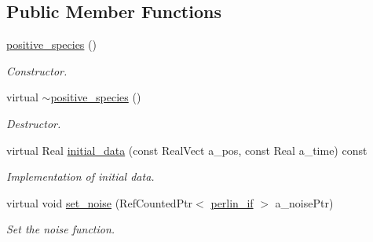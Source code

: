 \subsection*{Public Member Functions}
\begin{DoxyCompactItemize}
\item 
\hyperlink{classair__bolsig_1_1positive__species_a88ba2f6067b9c2c389585379de4f12ec}{positive\+\_\+species} ()
\begin{DoxyCompactList}\small\item\em Constructor. \end{DoxyCompactList}\item 
virtual \hyperlink{classair__bolsig_1_1positive__species_a4c6f9b6a4d05ace06a893184702e56a2}{$\sim$positive\+\_\+species} ()
\begin{DoxyCompactList}\small\item\em Destructor. \end{DoxyCompactList}\item 
virtual Real \hyperlink{classair__bolsig_1_1positive__species_a97bb4eb06b0eca9e87125b29d2183f31}{initial\+\_\+data} (const Real\+Vect a\+\_\+pos, const Real a\+\_\+time) const 
\begin{DoxyCompactList}\small\item\em Implementation of initial data. \end{DoxyCompactList}\item 
virtual void \hyperlink{classair__bolsig_1_1positive__species_ae265a2bc609833bea5820c594fee6926}{set\+\_\+noise} (Ref\+Counted\+Ptr$<$ \hyperlink{classperlin__if}{perlin\+\_\+if} $>$ a\+\_\+noise\+Ptr)
\begin{DoxyCompactList}\small\item\em Set the noise function. \end{DoxyCompactList}\end{DoxyCompactItemize}
